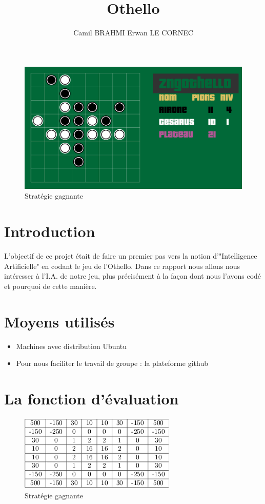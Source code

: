 \documentclass[a4paper, 11pt]{article}
\title{Othello }
\author{{Camil BRAHMI} {Erwan LE CORNEC}}
\begin{document}
\maketitle
\begin{figure}
\begin{center}
\includegraphics{zngOscreen.png} 
\end{center}
\caption{Stratégie gagnante}
\end{figure}

\newpage
\tableofcontents
\newpage

\section{Introduction}
  L'objectif de ce projet était de faire un premier pas vers la notion d'"Intelligence Artificielle" en codant le jeu de l'Othello. Dans ce rapport nous allons nous intéresser à l'I.A. de notre jeu, plus précisément à la façon dont nous l'avons codé et pourquoi de cette manière.
  

\section{Moyens utilisés}
\begin{itemize}
\item Machines avec distribution Ubuntu
\item Pour nous faciliter le travail de groupe : la plateforme github
\end{itemize}

\section{La fonction d'évaluation}
\begin{figure}
\begin{center}
\includegraphics{tableothello.png} 
\end{center}
\caption{Stratégie gagnante}
\end{figure}
\end{document}
